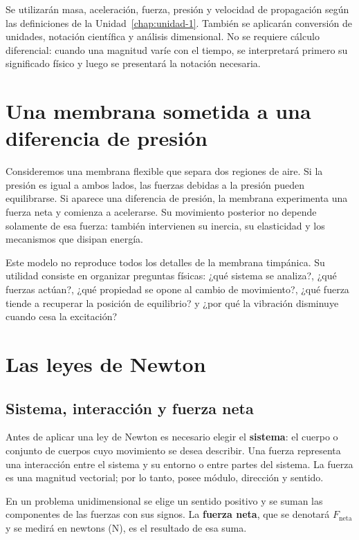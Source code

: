 Se utilizarán masa, aceleración, fuerza, presión y velocidad de propagación según las definiciones de la Unidad~\ref{chap:unidad-1}. También se aplicarán conversión de unidades, notación científica y análisis dimensional. No se requiere cálculo diferencial: cuando una magnitud varíe con el tiempo, se interpretará primero su significado físico y luego se presentará la notación necesaria.

\section{Una membrana sometida a una diferencia de presión}
\label{sec:u2-situacion}

Consideremos una membrana flexible que separa dos regiones de aire. Si la presión es igual a ambos lados, las fuerzas debidas a la presión pueden equilibrarse. Si aparece una diferencia de presión, la membrana experimenta una fuerza neta y comienza a acelerarse. Su movimiento posterior no depende solamente de esa fuerza: también intervienen su inercia, su elasticidad y los mecanismos que disipan energía.

Este modelo no reproduce todos los detalles de la membrana timpánica. Su utilidad consiste en organizar preguntas físicas: ¿qué sistema se analiza?, ¿qué fuerzas actúan?, ¿qué propiedad se opone al cambio de movimiento?, ¿qué fuerza tiende a recuperar la posición de equilibrio? y ¿por qué la vibración disminuye cuando cesa la excitación?

\section{Las leyes de Newton}
\label{sec:u2-newton}

\subsection{Sistema, interacción y fuerza neta}
\label{sec:u2-sistema-fuerza}

Antes de aplicar una ley de Newton es necesario elegir el \textbf{sistema}: el cuerpo o conjunto de cuerpos cuyo movimiento se desea describir. Una fuerza representa una interacción entre el sistema y su entorno o entre partes del sistema. La fuerza es una magnitud vectorial; por lo tanto, posee módulo, dirección y sentido.

En un problema unidimensional se elige un sentido positivo y se suman las componentes de las fuerzas con sus signos. La \textbf{fuerza neta}, que se denotará \(F_\mathrm{neta}\) y se medirá en newtons (\(\text{N}\)), es el resultado de esa suma.

